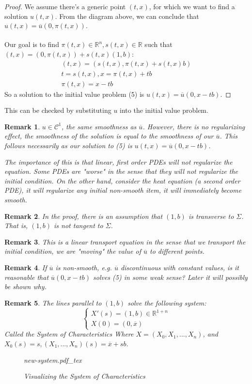 \documentclass[12pt]{article}
\newcommand{\incfig}[2][1]{%
    \def\svgwidth{#1\columnwidth}
    {#2.pdf_tex}
}
\newtheorem*{remark}{Remark}
\begin{document}
\begin{proof}
We assume there's a generic point $(t,x)$, for which we want to find a solution $u(t,x)$. From the diagram above, we can conclude that $u(t,x)=\overline{u}(0,\pi(t,x))$.
\\\\
Our goal is to find $\pi(t,x)\in\mathbb{R}^{n},s(t,x)\in\mathbb{R}$ such that $(t,x)=(0,\pi(t,x))+s(t,x)(1,b)$:
\begin{gather*}
    (t,x)=(s(t,x),\pi(t,x)+s(t,x)b)\\
    t=s(t,x), x=\pi(t,x)+tb\\
    \pi(t,x)=x-tb
\end{gather*}
So a solution to the initial value problem (5) is $u(t,x)=\overline{u}(0,x-tb)$.
\end{proof}
This can be checked by substituting $u$ into the initial value problem.
\begin{remark}
    $u\in\mathcal{C}^1$, the same smoothness as $\overline{u}$. However, there is no regularizing effect, the smoothness of the solution is equal to the smoothness of our $\overline{u}$. This follows necessarily as our solution to (5) is $u(t,x)=\overline{u}(0,x-tb)$.

    The importance of this is that linear, first order PDEs will not regularize the equation. Some PDEs are "worse" in the sense that they will not regularize the initial condition. On the other hand, consider the heat equation (a second order PDE), it will regularize any initial non-smooth item, it will immediately become smooth.
\end{remark}
\begin{remark}
    In the proof, there is an assumption that $(1, b)$ is transverse to $\Sigma$. That is, $(1,b)$ is not tangent to $\Sigma$.
\end{remark}
\begin{remark}
    This is a linear transport equation in the sense that we transport the initial condition, we are "moving" the value of $\overline{u}$ to different points.
\end{remark}
\begin{remark}
    If $\overline{u}$ is non-smooth, e.g. $\overline{u}$ discontinuous with constant values, is it reasonable that $\overline{u}(0,x-tb)$ solves (5) in some weak sense? Later it will possibly be shown why. 
\end{remark}
\begin{remark}
    The lines parallel to $(1,b)$ solve the following system:
    \[
        \begin{cases}
            X'(s)=(1,b)\in\mathbb{R}^{1+n}\\
            X(0)=(0,\overline{x})
        \end{cases}
    \]
    Called the System of Characteristics Where $X=(X_0,X_1,...,X_n)$, and $X_0(s)=s, (X_1,...,X_n)(s)=\overline{x}+sb$.
\begin{figure}[htbp]
    \hspace{1.6cm}
        \incfig{new-system}
    \caption{Visualizing the System of Characteristics}
    \label{fig:new-system}
\end{figure}
\end{remark}
\end{document}
